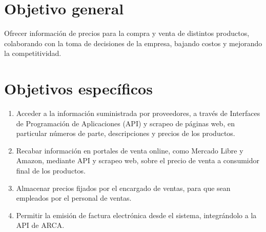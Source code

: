 \section{Objetivo general}

Ofrecer información de precios para la compra y venta de distintos productos,
colaborando con la toma de decisiones de la empresa, bajando costos y mejorando la competitividad.

\section{Objetivos específicos}

\begin{enumerate}
	\item Acceder a la información suministrada por proveedores,
	      a través de Interfaces de Programación de Aplicaciones (API) y scrapeo de páginas web,
	      en particular números de parte, descripciones y precios de los productos.
	\item Recabar información en portales de venta online, 
		  como Mercado Libre y Amazon,
		  mediante API y scrapeo web,
	      sobre el precio de venta a consumidor final de los productos.
	\item Almacenar precios fijados por el encargado de ventas,
	      para que sean empleados por el personal de ventas.
	\item Permitir la emisión de factura electrónica desde el sistema,
	      integrándolo a la API de ARCA.
\end{enumerate}
